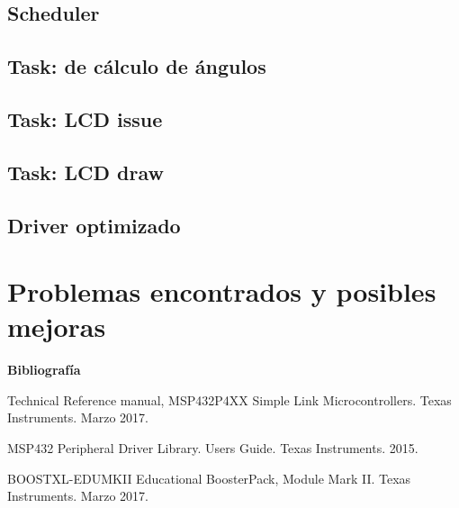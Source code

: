 \subsection{Scheduler}


\subsection{Task: de cálculo de ángulos}

\subsection{Task: LCD issue}

\subsection{Task: LCD draw}

\subsection{Driver optimizado}

\section{Problemas encontrados y posibles mejoras}


\textbf{ Bibliografía}

Technical Reference manual, MSP432P4XX Simple Link Microcontrollers. Texas Instruments. Marzo 2017.

MSP432 Peripheral Driver Library. Users Guide. Texas Instruments. 2015.

BOOSTXL-EDUMKII Educational BoosterPack, Module Mark II. Texas Instruments. Marzo 2017.


%
%
